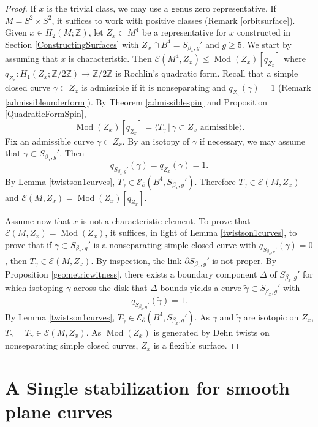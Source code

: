 \documentclass[10pt]{amsart}
\numberwithin{equation}{section}
\theoremstyle{plain}
\theoremstyle{definition}
\theoremstyle{remark}
\DeclareMathOperator{\Mod}{Mod}
\begin{document}
\begin{proof}
If $x$ is the trivial class, we may use a genus zero representative. If $M = S^2 \times S^2$, it suffices to work with positive classes (Remark \ref{orbitsurface}). Given $x \in H_2(M;\mathbb{Z})$, let $Z_x \subset M^4$ be a representative for $x$ constructed in Section \ref{ConstructingSurfaces} with $Z_x \cap B^4 = S_{\beta_x,g}'$ and $g \geq 5$. We start by assuming  that $x$ is characteristic. Then $\mathcal{E}(M^4,Z_x) \leq \Mod(Z_x)[q_{Z_x}]$ where $q_{Z_x} : H_1(Z_x;\mathbb{Z}/2\mathbb{Z}) \to \mathbb{Z}/2\mathbb{Z}$ is Rochlin's quadratic form. Recall that a simple closed curve $\gamma \subset Z_x$ is admissible if it is nonseparating and $q_{Z_x}(\gamma)  = 1$ (Remark \ref{admissibleunderform}). By Theorem \ref{admissiblespin} and Proposition \ref{QuadraticFormSpin}, \[\Mod(Z_x)[q_{Z_x}] = \langle T_\gamma \,|\, \gamma \subset Z_x \textrm{ admissible} \rangle.\] Fix an admissible curve $\gamma \subset Z_x$. By an isotopy of $\gamma$ if necessary, we may assume that $\gamma \subset S_{\beta_x,g}'$. Then \[ q_{S_{\beta_x,g}'}(\gamma) = q_{Z_x}(\gamma) = 1.\] By Lemma \ref{twistson1curves},  $T_{\gamma} \in \mathcal{E}_{\partial}(B^4,S_{\beta_x,g}')$. Therefore $T_{\gamma} \in \mathcal{E}(M,Z_x)$ and  $\mathcal{E}(M,Z_x) =  \Mod(Z_x)[q_{Z_x}]$. 



Assume now that $x$ is not a characteristic element. To prove that $\mathcal{E}(M,Z_x) = \Mod(Z_x)$, it suffices, in light of Lemma \ref{twistson1curves}, to prove that if $\gamma \subset S_{\beta_x,g}'$ is a nonseparating simple closed curve with $q_{S_{\beta_x,g}'}(\gamma) = 0$, then $T_{\gamma} \in \mathcal{E}(M,Z_x)$. By inspection, the link $\partial S_{\beta_x,g}'$ is not proper. By Proposition \ref{geometricwitness}, there exists a boundary component $\Delta$ of $S_{\beta_x,g}'$ for which isotoping $\gamma$ across the disk that $\Delta$ bounds yields a curve $\widetilde{\gamma} \subset S_{\beta_x,g}'$ with \[q_{S_{\beta_x,g}'}(\widetilde{\gamma}) = 1.\] By Lemma \ref{twistson1curves}, $T_{\widetilde{\gamma}} \in \mathcal{E}_{\partial}(B^4,S_{\beta_x,g}')$. As $\gamma$ and $\widetilde{\gamma}$ are isotopic on $Z_x$, $T_{\gamma} = T_{\widetilde{\gamma}} \in \mathcal{E}(M,Z_x)$. As $\Mod(Z_x)$ is generated by Dehn twists on nonseparating simple closed curves, $Z_x$ is a flexible surface. 
\end{proof}



\section{A Single stabilization for smooth plane curves}
\end{document}
